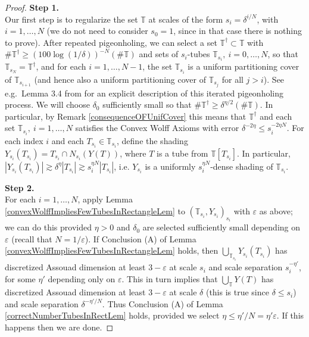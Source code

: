 \documentclass[letterpaper, reqno,11pt]{article}
\numberwithin{equation}{section}
\newcommand{\eps}{\varepsilon}
\newcommand{\tubes}{\mathbb{T}}
\numberwithin{thm}{section}
\theoremstyle{remark}
\begin{document}

\begin{proof}
\textbf{Step 1.}\\
Our first step is to regularize the set $\tubes$ at scales of the form $s_i=\delta^{i/N}$, with $i=1,\ldots,N$ (we do not need to consider $s_0 = 1$, since in that case there is nothing to prove). After repeated pigeonholing, we can select a set $\tubes^\dag \subset\tubes$ with $\#\tubes^\dag\geq (100\log(1/\delta))^{-N}(\#\tubes)$ and sets of $s_i$-tubes $\tubes_{s_i},\ i=0,\ldots,N$, so that $\tubes_{s_N}=\tubes^\dag$, and for each $i=1,\ldots,N-1$, the set $\tubes_{s_i}$ is a uniform partitioning cover of $\tubes_{s_{i+1}}$ (and hence also a uniform partitioning cover of $\tubes_{s_j}$ for all $j>i$). See e.g.~Lemma 3.4 from \cite{KS} for an explicit description of this iterated pigeonholing process. We will choose $\delta_0$ sufficiently small so that $\#\tubes^\dag\geq\delta^{\eta/2}(\#\tubes)$. In particular, by Remark \ref{consequenceOFUnifCover} this means that $\tubes^\dag$ and each set $\tubes_{s_i},\ i=1,\ldots,N$ satisfies the Convex Wolff Axioms with error $\delta^{-2\eta}\leq s_i^{-2\eta N}$. For each index $i$ and each $T_{s_i}\in\tubes_{s_i}$, define the shading $Y_{s_i}(T_{s_i})=T_{s_i}\cap N_{s_i}(Y(T))$, where $T$ is a tube from $\tubes[T_{s_i}]$. In particular, $|Y_{s_i}(T_{s_i})|\gtrsim \delta^\eta|T_{s_i}|\gtrsim s_i^{\eta N}|T_{s_i}|$, i.e. $Y_{s_i}$ is a uniformly $s_i^{\eta N}$-dense shading of $\tubes_{s_i}$.


\medskip

\noindent \textbf{Step 2.}\\
For each $i=1,\ldots,N$, apply Lemma \ref{convexWolffImpliesFewTubesInRectangleLem} to $(\tubes_{s_i},Y_{s_i})_{s_i}$ with $\eps$ as above; we can do this provided $\eta>0$ and $\delta_0$ are selected sufficiently small depending on $\eps$ (recall that $N=1/\eps$). If Conclusion (A) of Lemma \ref{convexWolffImpliesFewTubesInRectangleLem} holds, then $\bigcup_{\tubes_{s_i}}Y_{s_i}(T_{s_i})$ has discretized Assouad dimension at least $3-\eps$ at scale $s_i$ and scale separation $s_i^{-\eta'}$, for some $\eta'$ depending only on $\eps$. This in turn implies that $\bigcup_{\tubes}Y(T)$ has discretized Assouad dimension at least $3-\eps$ at scale $\delta$ (this is true since $\delta\leq s_i$) and scale separation $\delta^{-\eta'/N}$. Thus Conclusion (A) of Lemma \ref{correctNumberTubesInRectLem} holds, provided we select $\eta\leq \eta'/N = \eta'\eps$. If this happens then we are done.


\end{proof}
\end{document}
